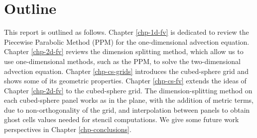\section{Outline}
This report is outlined as follows.
Chapter \ref{chp-1d-fv} is dedicated to review the Piecewise Parabolic Method (PPM)
for the one-dimensional advection equation. 
Chapter \ref{chp-2d-fv} reviews the dimension splitting method, which allow us to use 
one-dimensional methods, such as the PPM, to solve the two-dimensional advection equation.
Chapter \ref{chp-cs-grids} introduces the cubed-sphere grid and shows some of its geometric 
properties.
Chapter \ref{chp-cs-fv} extends the ideas of Chapter \ref{chp-2d-fv} to the cubed-sphere grid.
The dimension-splitting method on each cubed-sphere panel works as in the plane, with the addition
of metric terms, due to non-orthogonality of the grid, and interpolation between panels
to obtain ghost cells values needed for stencil computations. 
We give some future work perspectives in Chapter \ref{chp-conclusions}.
